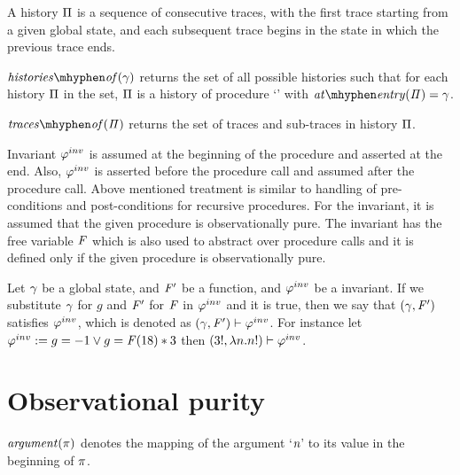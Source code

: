 \begin{definition}[history]
  A history $\Pi$ is a sequence of consecutive traces, with the
  first trace starting from a given global state, and each subsequent
  trace begins in the state in which the previous trace ends.
\end{definition}

\begin{definition} 
  $\historyOf{\gstate}$ returns the set of all possible histories such
  that for each history $\Pi$ in the set, $\Pi$ is a history
  of procedure `\foo' with $\atEntry{\history} = \gstate$.
\end{definition}

\begin{definition} $\tracesOf{\history}$ returns the set of traces and
  sub-traces in history $\Pi$.
\end{definition}

Invariant $\varphi^{inv}$ is assumed at the beginning of the procedure and
asserted at the end. Also, $\varphi^{inv}$ is asserted before the procedure
call and assumed after the procedure call. Above mentioned treatment
is similar to handling of pre-conditions and post-conditions for
recursive procedures. For the invariant, it is assumed that the given
procedure is observationally pure. The invariant has the free variable
$\mathit{F}$ which is also used to abstract over procedure calls and it is
defined only if the given procedure is observationally pure.

Let $\gamma$ be a global state, and $\mathit{F}'$ be a function, and $\varphi^{inv}$
be a invariant. If we substitute $\gamma$ for $g$ and $\mathit{F}'$ for $\mathit{F}$
in $\varphi^{inv}$ and it is true, then we say that $(\gamma, \mathit{F}')$ satisfies
$\varphi^{inv}$, which is denoted as $(\gamma, \mathit{F}') \vdash \varphi^{inv}$. For
instance let $\varphi^{inv} := g = -1 \vee g = \mathit{F}(18) * 3$ then $(3!, \lambda
n. n!) \vdash \varphi^{inv}$.

\section{Observational purity}\label{sec:op}

\begin{definition}
  $\mathit{argument(\pi)}$ denotes the mapping of the argument `$\textit{n}$' to its
  value in the beginning of $\pi$.
\end{definition}


